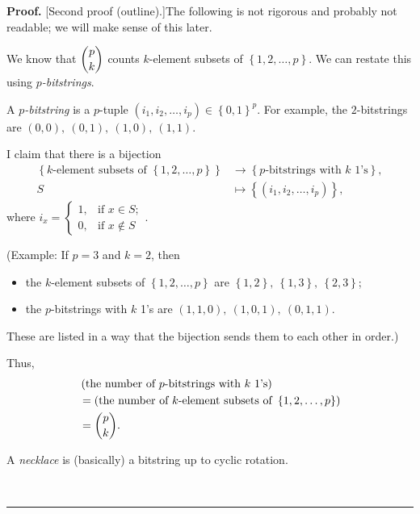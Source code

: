 \documentclass[numbers=enddot,12pt,final,onecolumn,notitlepage]{scrartcl}%
\numberwithin{exer}{subsection}
\theoremstyle{definition}
\newenvironment{proof}[1][Proof]{\noindent\textbf{#1.} }{\ \rule{0.5em}{0.5em}}
\begin{document}
\begin{proof}
[Second proof (outline).]The following is not rigorous and probably not
readable; we will make sense of this later.

We know that $\dbinom{p}{k}$ counts $k$-element subsets of $\left\{
1,2,\ldots,p\right\}  $. We can restate this using $p$\textit{-bitstrings}.

A $p$\textit{-bitstring} is a $p$-tuple $\left(  i_{1},i_{2},\ldots
,i_{p}\right)  \in\left\{  0,1\right\}  ^{p}$. For example, the $2$-bitstrings
are $\left(  0,0\right)  ,\ \left(  0,1\right)  ,\ \left(  1,0\right)
,\ \left(  1,1\right)  $.

I claim that there is a bijection%
\begin{align*}
\left\{  k\text{-element subsets of }\left\{  1,2,\ldots,p\right\}  \right\}
&  \rightarrow\left\{  p\text{-bitstrings with }k\text{ 1's}\right\}  ,\\
S  &  \mapsto\left\{  \left(  i_{1},i_{2},\ldots,i_{p}\right)  \right\}  ,
\end{align*}
where $i_{x}=%
\begin{cases}
1, & \text{if }x\in S;\\
0, & \text{if }x\notin S
\end{cases}
$.

(Example: If $p=3$ and $k=2$, then

\begin{itemize}
\item the $k$-element subsets of $\left\{  1,2,\ldots,p\right\}  $ are
$\left\{  1,2\right\}  ,\ \left\{  1,3\right\}  ,\ \left\{  2,3\right\}  $;

\item the $p$-bitstrings with $k$ 1's are $\left(  1,1,0\right)  ,\ \left(
1,0,1\right)  ,\ \left(  0,1,1\right)  $.
\end{itemize}

These are listed in a way that the bijection sends them to each other in order.)

Thus,%
\begin{align*}
&  \left(  \text{the number of }p\text{-bitstrings with }k\text{ 1's}\right)
\\
&  =\left(  \text{the number of }k\text{-element subsets of }\left\{
1,2,\ldots,p\right\}  \right) \\
&  =\dbinom{p}{k}.
\end{align*}


A \textit{necklace} is (basically) a bitstring up to cyclic rotation.


\end{proof}
\end{document}

